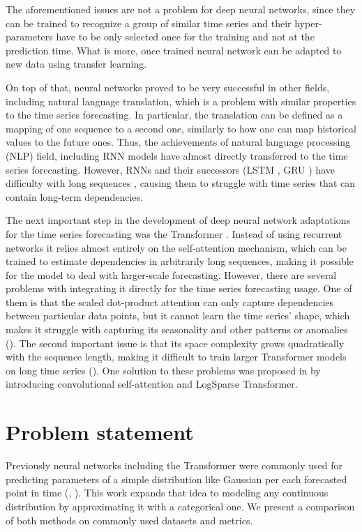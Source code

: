 \documentclass[en]{pracamgr}
\begin{document}
The aforementioned issues are not a problem for deep neural networks, since they can be trained to recognize a group of similar time series and their hyper-parameters have to be only selected once for the training and not at the prediction time. What is more, once trained neural network can be adapted to new data using transfer learning. 

On top of that, neural networks proved to be very successful in other fields, including natural language translation, which is a problem with similar properties to the time series forecasting. In particular, the translation can be defined as a mapping of one sequence to a second one, similarly to how one can map historical values to the future ones. Thus, the achievements of natural language processing (NLP) field, including RNN models have almost directly transferred to the time series forecasting. However, RNNs and their successors (LSTM \cite{lstm}, GRU \cite{gru}) have difficulty with long sequences \cite{context}, causing them to struggle with time series that can contain long-term dependencies.

The next important step in the development of deep neural network adaptations for the time series forecasting was the Transformer \cite{tr}. Instead of using recurrent networks it relies almost entirely on the self-attention mechanism, which can be trained to estimate dependencies in arbitrarily long sequences, making it possible for the model to deal with larger-scale forecasting.
However, there are several problems with integrating it directly for the time series forecasting usage. One of them is that the scaled dot-product attention can only capture dependencies between particular data points, but it cannot learn the time series' shape, which makes it struggle with capturing its seasonality and other patterns or anomalies (\cite{enhancing}). The second important issue is that its space complexity grows quadratically with the sequence length, making it difficult to train larger Transformer models on long time series (\cite{enhancing}).
One solution to these problems was proposed in \cite{enhancing} by introducing convolutional self-attention and LogSparse Transformer.



\section*{Problem statement}\label{r:problemst}

Previously neural networks including the Transformer were commonly used for predicting parameters of a simple distribution like Gaussian per each forecasted point in time (\cite{deepar}, \cite{enhancing}). This work expands that idea to modeling any continuous distribution by approximating it with a categorical one. We present a comparison of both methods on commonly used datasets and metrics.
\end{document}
